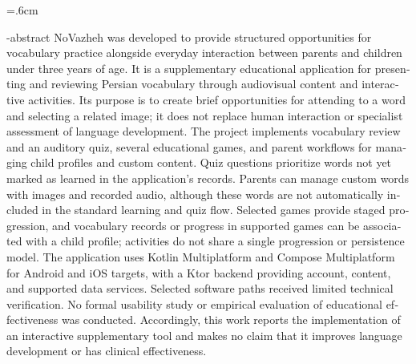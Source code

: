 
\baselineskip=.6cm
\begin{latin}
\en-abstract{
	 NoVazheh was developed to provide structured opportunities for vocabulary practice alongside everyday interaction between parents and children under three years of age. It is a supplementary educational application for presenting and reviewing Persian vocabulary through audiovisual content and interactive activities. Its purpose is to create brief opportunities for attending to a word and selecting a related image; it does not replace human interaction or specialist assessment of language development. The project implements vocabulary review and an auditory quiz, several educational games, and parent workflows for managing child profiles and custom content. Quiz questions prioritize words not yet marked as learned in the application's records. Parents can manage custom words with images and recorded audio, although these words are not automatically included in the standard learning and quiz flow. Selected games provide staged progression, and vocabulary records or progress in supported games can be associated with a child profile; activities do not share a single progression or persistence model. The application uses Kotlin Multiplatform and Compose Multiplatform for Android and iOS targets, with a Ktor backend providing account, content, and supported data services. Selected software paths received limited technical verification. No formal usability study or empirical evaluation of educational effectiveness was conducted. Accordingly, this work reports the implementation of an interactive supplementary tool and makes no claim that it improves language development or has clinical effectiveness.}
\latinfirstPage
\end{latin}
